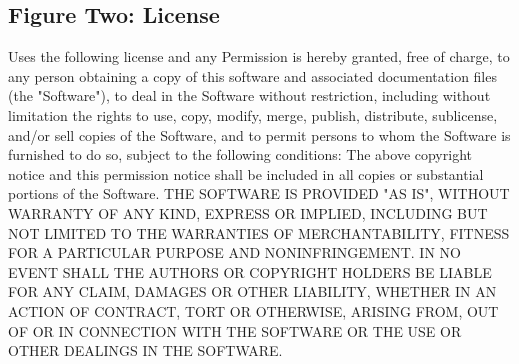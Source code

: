 \documentclass[onecolumn, draftclsnofoot,10pt, compsoc]{IEEEtran}
\begin{document}
	\subsection{Figure Two: License}
		Uses the following license and any Permission is hereby granted, free of charge, to any person obtaining a copy of this software and associated documentation files (the "Software"), to deal in the Software without restriction, including without limitation the rights to use, copy, modify, merge, publish, distribute, sublicense, and/or sell copies of the Software, and to permit persons to whom the Software is
		furnished to do so, subject to the following conditions:
		The above copyright notice and this permission notice shall be included in
		all copies or substantial portions of the Software. \newline
		THE SOFTWARE IS PROVIDED "AS IS", WITHOUT WARRANTY OF ANY KIND, EXPRESS OR
		IMPLIED, INCLUDING BUT NOT LIMITED TO THE WARRANTIES OF MERCHANTABILITY,
		FITNESS FOR A PARTICULAR PURPOSE AND NONINFRINGEMENT. IN NO EVENT SHALL THE
		AUTHORS OR COPYRIGHT HOLDERS BE LIABLE FOR ANY CLAIM, DAMAGES OR OTHER
		LIABILITY, WHETHER IN AN ACTION OF CONTRACT, TORT OR OTHERWISE, ARISING FROM,
		OUT OF OR IN CONNECTION WITH THE SOFTWARE OR THE USE OR OTHER DEALINGS IN
		THE SOFTWARE. 
\end{document}
